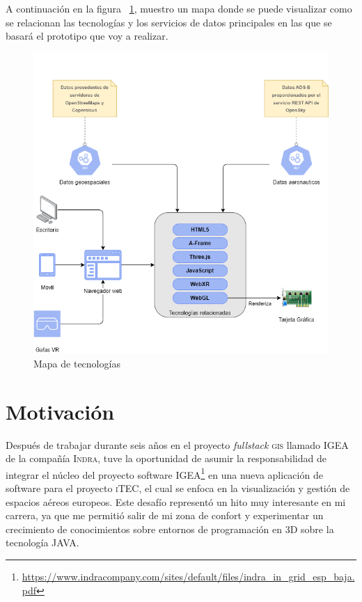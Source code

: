 \documentclass[a4paper, 11pt]{book}
\begin{document}
A continuación en la figura ~\ref{figura:mapaTecnologias}, muestro un mapa donde se puede visualizar como se relacionan las tecnologías y los servicios de datos principales en las que se basará el prototipo que voy a realizar. 
 \begin{figure}[h]
    \centering
    \includegraphics[bb=0 0 564 586, width=13cm, keepaspectratio]{img/mapaFuncional.drawio.png}
    \caption{Mapa de tecnologías}
    \label{figura:mapaTecnologias}
 \end{figure}
\clearpage
\section{Motivación}
\label{sec:motivación}

Después de trabajar durante seis años en el proyecto \emph{fullstack} \textsc{\gls{gis}} llamado \textsc{IGEA} de la compañía \textsc{Indra}, tuve la oportunidad de asumir la responsabilidad de integrar el núcleo del proyecto software \textsc{IGEA}\footnote{\url{https://www.indracompany.com/sites/default/files/indra_in_grid_esp_baja.pdf}} en una nueva aplicación de software para el proyecto \textsc{iTEC}, el cual se enfoca en la visualización y gestión de espacios aéreos europeos. Este desafío representó un hito muy interesante en mi carrera, ya que me permitió salir de mi zona de confort y experimentar un crecimiento de conocimientos sobre entornos de programación en 3D sobre la tecnología \textsc{JAVA}.
\end{document}
